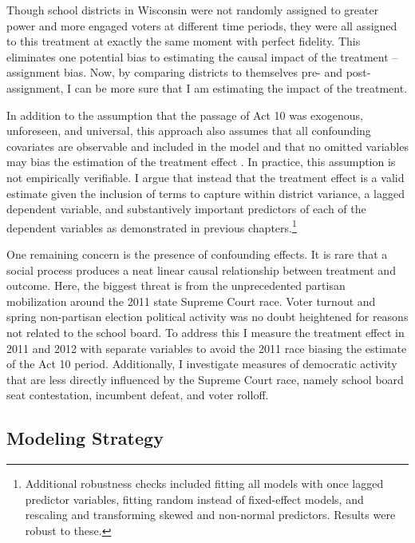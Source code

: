 Though school districts in Wisconsin were not randomly assigned to greater power 
and more engaged voters at different time periods, they were all assigned to this 
treatment at exactly the same moment with perfect fidelity. This eliminates one 
potential bias to estimating the causal impact of the treatment -- assignment 
bias. Now, by comparing districts to themselves pre- and post- assignment, I can 
be more sure that I am estimating the impact of the treatment. 

In addition to the assumption that the 
passage of Act 10 was exogenous, unforeseen, and universal, this approach also 
assumes that all confounding covariates are observable and included in the model 
and that no omitted variables may bias the estimation of the treatment effect 
\cite{gelhill}. In practice, this assumption is not empirically verifiable. I 
argue that instead that the treatment effect is a valid estimate given the 
inclusion of terms to capture within district variance, a lagged 
dependent variable, and substantively important predictors of 
each of the dependent variables as demonstrated in previous chapters.\footnote{
Additional robustness checks included fitting all models with once lagged predictor 
variables, fitting random instead of fixed-effect models, and rescaling and 
transforming skewed and non-normal predictors. Results were robust to these.}

One remaining concern is the presence of confounding effects. It is rare 
that a social process produces a neat linear causal relationship between treatment 
and outcome. Here, the biggest threat is from the unprecedented partisan mobilization 
around the 2011 state Supreme Court race. Voter turnout and spring non-partisan 
election political activity was no doubt heightened for reasons not related to the 
school board. To address this I measure the treatment effect in 2011 and 2012 with 
separate variables to avoid the 2011 race biasing the estimate of the Act 10 
period. Additionally, I investigate measures of democratic activity that are 
less directly influenced by the Supreme Court race, namely school board seat 
contestation, incumbent defeat, and voter rolloff. 

\subsection{Modeling Strategy}

